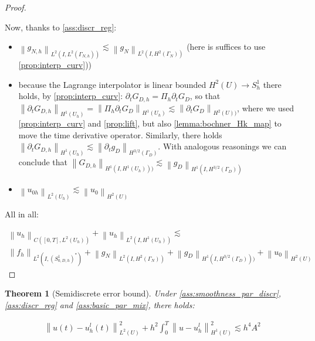 \documentclass[english,a4paper,10pt,oneside]{scrbook}	%
\theoremstyle{break}
\newtheorem{thm}[equation]{Theorem}
\newenvironment{mproof}[1][\proofname]{%
  \begin{proof}[#1]$ $\par\nobreak\ignorespaces
}{%
  \end{proof}
}
\renewcommand*{\proofname}{Proof}
\theoremstyle{remark}
\newcommand{\norm}[1]{\left\lVert#1\right\rVert}
\begin{document}
\begin{appendices}
\begin{mproof}
Now, thanks to \cref{ass:discr_reg}:

\begin{itemize}
	\item $\norm{g_{N,h}}_{L^2(I,L^2(\Gamma_{N,h}))} \lesssim \norm{g_{N}}_{L^2(I,H^2(\Gamma_{N}))} $ (here is suffices to use \cref{prop:interp_curv}))
	\item because the Lagrange interpolator is linear bounded $H^2(U)\rightarrow S^1_h$ there holds, by \cref{prop:interp_curv}: $\partial_t G_{D,h}=\Pi_h \partial_t G_D$, so that $\norm{\partial_t G_{D,h}}_{H^1(U_h)} = \norm{\Pi_h \partial_t G_D}_{H^1(U_h)} \lesssim \norm{\partial_t G_D}_{H^2(U))}$, where we used \cref{prop:interp_curv} and \cref{prop:lift}, but also \cref{lemma:bochner_Hk_map} to move the time derivative operator. Similarly, there holds $\norm{\partial_t G_{D,h}}_{H^1(U_h)}\lesssim \norm{\partial_t g_D}_{H^{3/2}(\Gamma_D)}$. With analogous reasonings we can conclude that $\norm{G_{D,h}}_{H^1(I,H^1(U_h)))}\lesssim \norm{g_D}_{H^1(I,H^{3/2}(\Gamma_D))}$
	\item  $\norm{u_{0h}}_{L^2(U_h)}\lesssim \norm{u_{0}}_{H^2(U)}$
\end{itemize}


All in all:

\begin{align*}
	\norm{u_h}_{C([0,T],L^2(U_h))} + \norm{u_h}_{L^2(I,H^1(U_h))}\lesssim \\\norm{f_h}_{L^2(I,(S^1_{0,D,h})^*)} + \norm{g_{N}}_{L^2(I,H^2(\Gamma_{N}))} + \norm{g_D}_{H^1(I,H^{3/2}(\Gamma_D)))} + \norm{u_{0}}_{H^2(U)}
\end{align*}
\end{mproof}

\begin{thm}[Semidiscrete error bound]
\label{thm:semidiscrete_error_bound}
Under \cref{ass:smoothness_par_discr}, \cref{ass:discr_reg} and \cref{ass:basic_par_mix}, there holds:

\begin{align*}
	 \norm{u(t)-u_h^l(t)}_{L^2(U)}^2 + h^{2}\int_0^T\norm{u-u_h^l}^2_{H^1(U)} \lesssim
	 h^4A^2
\end{align*}


\end{thm}
\end{appendices}
\end{document}
